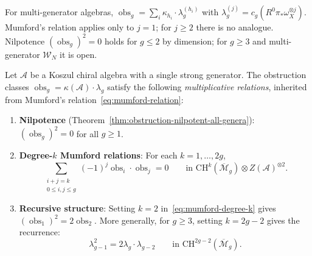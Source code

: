 \begin{remark}\label{rem:multi-generator-nilpotence}
For multi-generator algebras, $\operatorname{obs}_g=\sum_i\kappa_{h_i}
\cdot\lambda_g^{(h_i)}$ with
$\lambda_g^{(j)}=c_g(R^0\pi_*\omega_X^{\otimes j})$.
Mumford's relation applies only to $j=1$; for $j\geq 2$ there is
no analogue.  Nilpotence $(\operatorname{obs}_g)^2=0$ holds for
$g\leq 2$ by dimension; for $g\geq 3$ and multi-generator
$\mathcal{W}_N$ it is open.
\end{remark}

\begin{corollary}
\label{cor:mumford-multiplicative}
Let $\mathcal{A}$ be a Koszul chiral algebra with a single strong generator.
The obstruction classes
$\operatorname{obs}_g = \kappa(\mathcal{A}) \cdot \lambda_g$ satisfy the
following \emph{multiplicative relations}, inherited from
Mumford's relation~\eqref{eq:mumford-relation}:
\begin{enumerate}[label=\textup{(\alph*)}]
\item \textbf{Nilpotence} (Theorem~\ref{thm:obstruction-nilpotent-all-genera}):
$(\operatorname{obs}_g)^2 = 0$ for all $g \geq 1$.
\item \textbf{Degree-$k$ Mumford relations}: For each
$k = 1, \ldots, 2g$,
\begin{equation}\label{eq:mumford-degree-k}
\sum_{\substack{i + j = k \\ 0 \leq i,j \leq g}}
(-1)^j \operatorname{obs}_i \cdot \operatorname{obs}_j = 0
\qquad \text{in } \mathrm{CH}^k(\overline{\mathcal{M}}_g) \otimes Z(\mathcal{A})^{\otimes 2}.
\end{equation}
\item \textbf{Recursive structure}: Setting $k = 2$ in~\eqref{eq:mumford-degree-k}
gives $(\operatorname{obs}_1)^2 = 2 \operatorname{obs}_2$. More generally, for $g \geq 3$,
setting $k = 2g - 2$ gives the recurrence:
\begin{equation}\label{eq:lambda-recurrence}
\lambda_{g-1}^2 = 2\lambda_g \cdot \lambda_{g-2}
\qquad \text{in } \mathrm{CH}^{2g-2}(\overline{\mathcal{M}}_g).
\end{equation}
\end{enumerate}
\end{corollary}

